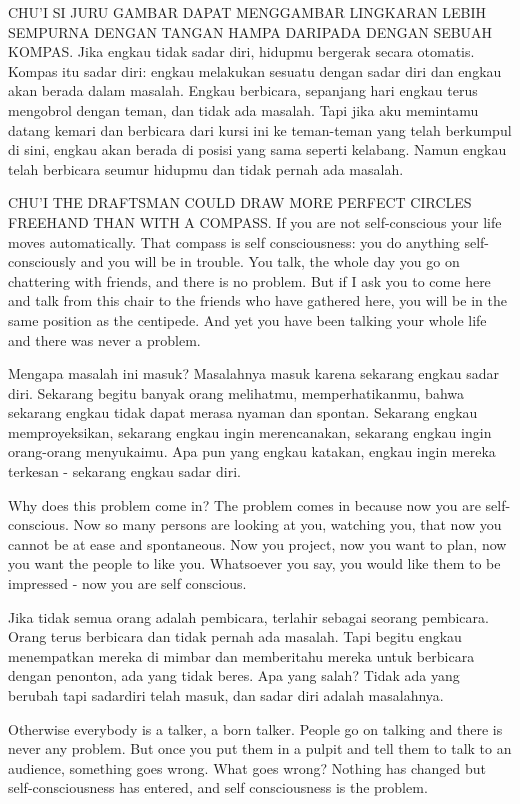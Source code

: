 \bahasa
CHU'I SI JURU GAMBAR DAPAT MENGGAMBAR LINGKARAN LEBIH SEMPURNA DENGAN TANGAN HAMPA DARIPADA DENGAN SEBUAH KOMPAS. Jika engkau tidak sadar diri, hidupmu bergerak secara otomatis. Kompas itu sadar diri: engkau melakukan sesuatu dengan sadar diri dan engkau akan berada dalam masalah. Engkau berbicara, sepanjang hari engkau terus mengobrol dengan teman, dan tidak ada masalah. Tapi jika aku memintamu datang kemari dan berbicara dari kursi ini ke teman-teman yang telah berkumpul di sini, engkau akan berada di posisi yang sama seperti kelabang. Namun engkau telah berbicara seumur hidupmu dan tidak pernah ada masalah.

\english
CHU'I THE DRAFTSMAN COULD DRAW MORE PERFECT CIRCLES FREEHAND THAN WITH A COMPASS. If you are not self-conscious your life moves automatically. That compass is self consciousness: you do anything self-consciously and you will be in trouble. You talk, the whole day you go on chattering with friends, and there is no problem. But if I ask you to come here and talk from this chair to the friends who have gathered here, you will be in the same position as the centipede. And yet you have been talking your whole life and there was never a problem.

\bahasa
Mengapa masalah ini masuk? Masalahnya masuk karena sekarang engkau sadar diri. Sekarang begitu banyak orang melihatmu, memperhatikanmu, bahwa sekarang engkau tidak dapat merasa nyaman dan spontan. Sekarang engkau memproyeksikan, sekarang engkau ingin merencanakan, sekarang engkau ingin orang-orang menyukaimu. Apa pun yang engkau katakan, engkau ingin mereka terkesan - sekarang engkau sadar diri.

\english
Why does this problem come in? The problem comes in because now you are self-conscious. Now so many persons are looking at you, watching you, that now you cannot be at ease and spontaneous. Now you project, now you want to plan, now you want the people to like you. Whatsoever you say, you would like them to be impressed - now you are self conscious.

\bahasa
Jika tidak semua orang adalah pembicara, terlahir sebagai seorang pembicara. Orang terus berbicara dan tidak pernah ada masalah. Tapi begitu engkau menempatkan mereka di mimbar dan memberitahu mereka untuk berbicara dengan penonton, ada yang tidak beres. Apa yang salah? Tidak ada yang berubah tapi sadardiri telah masuk, dan sadar diri adalah masalahnya.

\english
Otherwise everybody is a talker, a born talker. People go on talking and there is never any problem. But once you put them in a pulpit and tell them to talk to an audience, something goes wrong. What goes wrong? Nothing has changed but self-consciousness has entered, and self consciousness is the problem.

